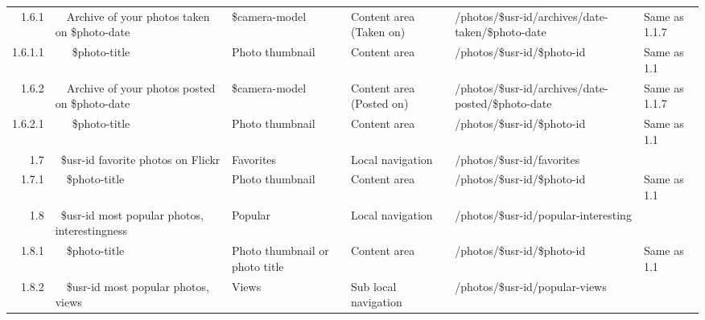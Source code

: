 \documentclass[12pt,a4paper]{article}
\begin{document}
\begin{landscape}
\begin{table}[h!b!p!]
\begin{center}
\begin{tiny}
\begin{tabular}{r|l|l|l|l|p{3cm}}
                1.6.1 &
                ~~Archive of your photos taken on \$photo-date &
                \$camera-model &
                Content area (Taken on) &
                /photos/\$usr-id/archives/date-taken/\$photo-date &
                Same as 1.1.7 \\

                  1.6.1.1 &
                  ~~~\$photo-title &
                  Photo thumbnail &
                  Content area &
                  /photos/\$usr-id/\$photo-id &
                  Same as 1.1 \\

                1.6.2 &
                ~~Archive of your photos posted on \$photo-date &
                \$camera-model &
                Content area (Posted on) &
                /photos/\$usr-id/archives/date-posted/\$photo-date &
                Same as 1.1.7 \\

                  1.6.2.1 &
                  ~~~\$photo-title &
                  Photo thumbnail &
                  Content area &
                  /photos/\$usr-id/\$photo-id &
                  Same as 1.1 \\

              1.7 &
              ~\$usr-id favorite photos on Flickr &
              Favorites &
              Local navigation &
              /photos/\$usr-id/favorites &
              \\

                1.7.1 &
                ~~\$photo-title &
                Photo thumbnail &
                Content area &
                /photos/\$usr-id/\$photo-id &
                Same as 1.1 \\

              1.8 &
              ~\$usr-id most popular photos, interestingness &
              Popular &
              Local navigation &
              /photos/\$usr-id/popular-interesting &
              \\

                1.8.1 &
                ~~\$photo-title &
                Photo thumbnail or photo title &
                Content area &
                /photos/\$usr-id/\$photo-id &
                Same as 1.1 \\

                1.8.2 &
                ~~\$usr-id most popular photos, views &
                Views &
                Sub local navigation &
                /photos/\$usr-id/popular-views &
                \\


\end{tabular}
\end{tiny}
\end{center}
\end{table}
\end{landscape}
\end{document}
